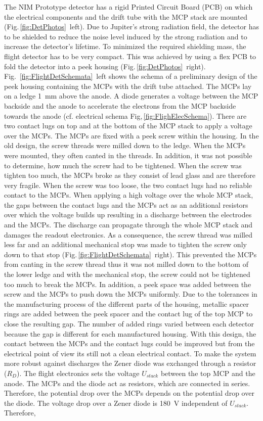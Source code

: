 		The NIM Prototype detector has a rigid Printed Circuit Board (PCB) on which the electrical components and the drift tube with the MCP stack are mounted (Fig.\,\ref{fig:DetPhotos}~left). Due to Jupiter's strong radiation field, the detector has to be shielded to reduce the noise level induced by the strong radiation and to increase the detector's lifetime. To minimized the required shielding mass, the flight detector has to be very compact. This was achieved by using a flex PCB to fold the detector into a peek housing (Fig.\,\ref{fig:DetPhotos}~right). Fig.~\ref{fig:FlightDetSchemata}~left shows the schema of a preliminary design of the peek housing containing the MCPs with the drift tube attached. The MCPs lay on a ledge 1~mm above the anode. A diode generates a voltage between the MCP backside and the anode to accelerate the electrons from the MCP backside towards the anode (cf. electrical schema Fig,\,\ref{fig:FlighElecSchema}). There are two contact lugs on top and at the bottom of the MCP stack to apply a voltage over the MCPs. The MCPs are fixed with a peek screw within the housing. In the old design, the screw threads were milled down to the ledge. When the MCPs were mounted, they often canted in the threads. In addition, it was not possible to determine, how much the screw had to be tightened. When the screw was tighten too much, the MCPs broke as they consist of lead glass and are therefore very fragile. When the screw was too loose, the two contact lugs had no reliable contact to the MCPs. When applying a high voltage over the whole MCP stack, the gaps between the contact lugs and the MCPs act as an additional resistors over which the voltage builds up resulting in a discharge between the electrodes and the MCPs. The discharge can propagate through the whole MCP stack and damages the readout electronics. As a consequence, the screw thread was milled less far and an additional mechanical stop was made to tighten the screw only down to that stop (Fig.\,\ref{fig:FlightDetSchemata}~right). This prevented the MCPs from canting in the screw thread thus it was not milled down to the bottom of the lower ledge and with the mechanical stop, the screw could not be tightened too much to break the MCPs. In addition, a peek space was added between the screw and the MCPs to push down the MCPs uniformly. Due to the tolerances in the manufacturing process of the different parts of the housing, metallic spacer rings are added between the peek spacer and the contact lug of the top MCP to close the resulting gap. The number of added rings varied between each detector because the gap is different for each manufactured housing. With this design, the contact between the MCPs and the contact lugs could be improved but from the electrical point of view its still not a clean electrical contact. To make the system more robust against discharges the Zener diode was exchanged through a resistor ($R_D$). The flight electronics sets the voltage $U_{stack}$ between the top MCP and the anode. The MCPs and the diode act as resistors, which are connected in series. Therefore, the potential drop over the MCPs depends on the potential drop over the diode. The voltage drop over a Zener diode is 180~V independent of $U_{stack}$. Therefore, 